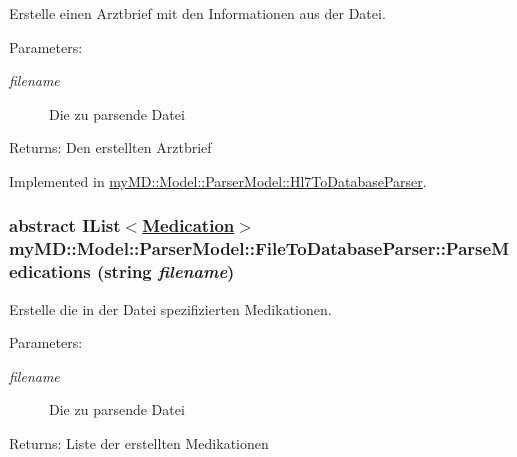 Erstelle einen Arztbrief mit den Informationen aus der Datei. 

\begin{Desc}
\item[Parameters:]
\begin{description}
\item[{\em filename}]Die zu parsende Datei\end{description}
\end{Desc}
\begin{Desc}
\item[Returns:]Den erstellten Arztbrief\end{Desc}


Implemented in \hyperlink{classmy_m_d_1_1_model_1_1_parser_model_1_1_hl7_to_database_parser_d8ae1d1ef5060c24906a67b82f7b3329}{my\-MD::Model::Parser\-Model::Hl7To\-Database\-Parser}.\hypertarget{classmy_m_d_1_1_model_1_1_parser_model_1_1_file_to_database_parser_84eaf7d498558fe57b2f248968a439b4}{
\subsubsection[ParseMedications]{\setlength{\rightskip}{0pt plus 5cm}abstract IList$<$\hyperlink{classmy_m_d_1_1_model_1_1_data_model_1_1_medication}{Medication}$>$ my\-MD::Model::Parser\-Model::File\-To\-Database\-Parser::Parse\-Medications (string {\em filename})}}
\label{df/d8f/classmy_m_d_1_1_model_1_1_parser_model_1_1_file_to_database_parser_84eaf7d498558fe57b2f248968a439b4}


Erstelle die in der Datei spezifizierten Medikationen. 

\begin{Desc}
\item[Parameters:]
\begin{description}
\item[{\em filename}]Die zu parsende Datei\end{description}
\end{Desc}
\begin{Desc}
\item[Returns:]Liste der erstellten Medikationen\end{Desc}


